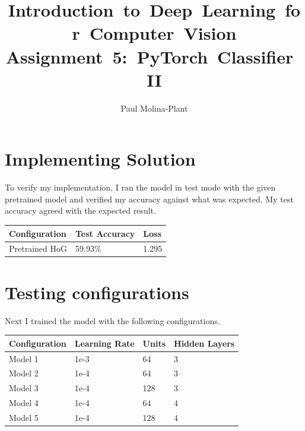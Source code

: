 \documentclass[12pt, letter]{article}
\newcommand{\courseName}{Introduction~to~Deep~Learning~for~Computer~Vision}
\newcommand{\assignName}{Assignment~5:~PyTorch~Classifier~II}
\begin{document}
\pagestyle{titlesec_assignment}

\title{\courseName\\\assignName}
\author{Paul Molina-Plant}
\maketitle


\section{Implementing Solution}

To verify my implementation, I ran the model in test mode with the given
pretrained model and verified my accuracy against what was expected. My
test accuracy agreed with the expected result. \\

\begin{tabular}{lll}
  Configuration  & Test Accuracy & Loss  \\
  \hline
  Pretrained HoG & 59.93\%       & 1.295
\end{tabular}

\section{Testing configurations}
Next I trained the model with the following configurations. \\

\begin{tabular}{llll}
  Configuration  & Learning Rate & Units & Hidden Layers  \\
  \hline
  Model 1        & {1e-3}        & 64    & 3 \\
  Model 2        & {1e-4}        & 64    & 3 \\
  Model 3        & {1e-4}        & 128   & 3 \\
  Model 4        & {1e-4}        & 64    & 4 \\
  Model 5        & {1e-4}        & 128   & 4 \\
\end{tabular}

\pagebreak
\end{document}
